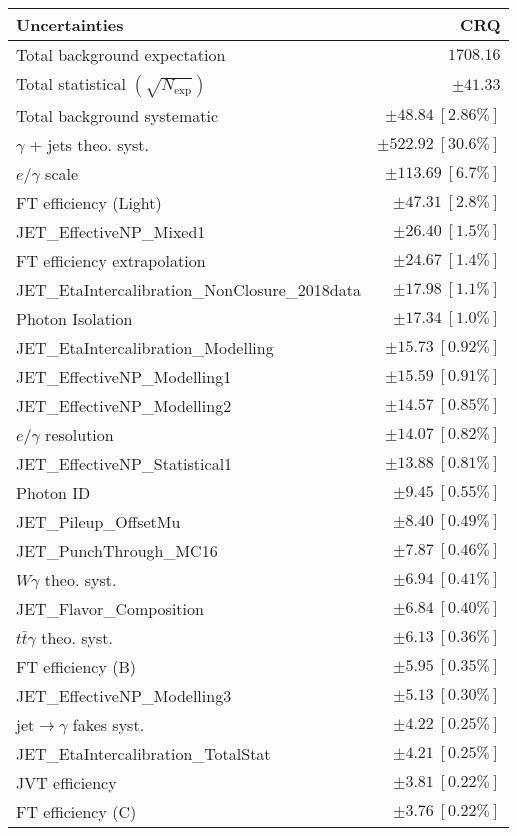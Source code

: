 \begin{tabular}{lr}
\hline
\textbf{Uncertainties} & \textbf{CRQ} \\
\hline
Total background expectation & $1708.16$ \\
\hline
Total statistical $(\sqrt{N_\mathrm{exp}})$ & $\pm 41.33$ \\
Total background systematic & $\pm 48.84\ [2.86\%]$ \\
\hline
\hline
$\gamma$ + jets theo. syst. & $\pm 522.92\ [30.6\%]$ \\
$e/\gamma$ scale & $\pm 113.69\ [6.7\%]$ \\
FT efficiency (Light) & $\pm 47.31\ [2.8\%]$ \\
JET\_EffectiveNP\_Mixed1 & $\pm 26.40\ [1.5\%]$ \\
FT efficiency extrapolation & $\pm 24.67\ [1.4\%]$ \\
JET\_EtaIntercalibration\_NonClosure\_2018data & $\pm 17.98\ [1.1\%]$ \\
Photon Isolation & $\pm 17.34\ [1.0\%]$ \\
JET\_EtaIntercalibration\_Modelling & $\pm 15.73\ [0.92\%]$ \\
JET\_EffectiveNP\_Modelling1 & $\pm 15.59\ [0.91\%]$ \\
JET\_EffectiveNP\_Modelling2 & $\pm 14.57\ [0.85\%]$ \\
$e/\gamma$ resolution & $\pm 14.07\ [0.82\%]$ \\
JET\_EffectiveNP\_Statistical1 & $\pm 13.88\ [0.81\%]$ \\
Photon ID & $\pm 9.45\ [0.55\%]$ \\
JET\_Pileup\_OffsetMu & $\pm 8.40\ [0.49\%]$ \\
JET\_PunchThrough\_MC16 & $\pm 7.87\ [0.46\%]$ \\
$W\gamma$ theo. syst. & $\pm 6.94\ [0.41\%]$ \\
JET\_Flavor\_Composition & $\pm 6.84\ [0.40\%]$ \\
$t\bar{t}\gamma$ theo. syst. & $\pm 6.13\ [0.36\%]$ \\
FT efficiency (B) & $\pm 5.95\ [0.35\%]$ \\
JET\_EffectiveNP\_Modelling3 & $\pm 5.13\ [0.30\%]$ \\
jet$\to\gamma$ fakes syst. & $\pm 4.22\ [0.25\%]$ \\
JET\_EtaIntercalibration\_TotalStat & $\pm 4.21\ [0.25\%]$ \\
JVT efficiency & $\pm 3.81\ [0.22\%]$ \\
FT efficiency (C) & $\pm 3.76\ [0.22\%]$ \\

\end{tabular}
